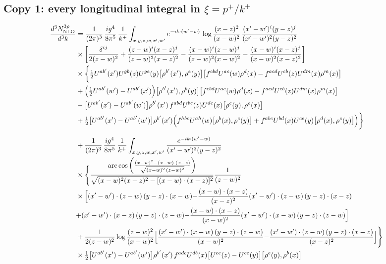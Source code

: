 \documentclass[10pt]{article}
\begin{document}
\subsection*{Copy 1: every longitudinal integral in $\xi=p^{+}/k^{+}$}
\begin{align}
\frac{d^{3}N^{3\rho}_{\rm NLO}}{d^{3}k}&=\frac{1}{(2\pi)^{3}}\,\frac{ig^{4}}{8\pi^{5}}\,\frac{1}{k^{+}}\int_{x,y,z,w,x',w'}e^{-ik\cdot(w'-w)}\,\log\frac{(x-z)^{2}}{(x-w)^{2}}\,\frac{(x'-w')^{i}(y-z)^{j}}{(x'-w')^{2}(y-z)^{2}}\notag\\
&\times\bigg[\frac{\delta^{ij}}{2(z-w)^{2}}+\frac{(z-w)^{i}(x-z)^{j}}{(z-w)^{2}(x-z)^{2}}-\frac{(x-w)^{i}(z-w)^{j}}{(z-w)^{2}(x-w)^{2}}-\frac{(x-w)^{i}(x-z)^{j}}{(x-w)^{2}(x-z)^{2}}\bigg]\notag\\
&\times\bigg\{\tfrac12U^{ab'}(x')U^{gb}(z)U^{ge}(y)\big[\rho^{b'}(x'),\rho^{e}(y)\big]\big[f^{cbd}U^{ac}(w)\rho^{d}(x)-f^{acd}U^{cb}(z)U^{dm}(x)\rho^{m}(x)\big]\notag\\
&+\Big(\tfrac12U^{ab'}(w')-U^{ab'}(x')\Big)\big[\rho^{b'}(x'),\rho^{b}(y)\big]\big[f^{cbd}U^{ac}(w)\rho^{d}(x)-f^{acd}U^{cb}(z)U^{dm}(x)\rho^{m}(x)\big]\notag\\
&-\big[U^{ab'}(x')-U^{ab'}(w')\big]\rho^{b'}(x')\,f^{abd}U^{bc}(z)U^{de}(x)\big[\rho^{c}(y),\rho^{e}(x)\big]\notag\\
&+\tfrac12\big[U^{ab'}(x')-U^{ab'}(w')\big]\rho^{b'}(x')\Big(f^{hbc}U^{ah}(w)\big[\rho^{b}(x),\rho^{c}(y)\big]+f^{abc}U^{bd}(x)U^{ce}(y)\big[\rho^{d}(x),\rho^{e}(y)\big]\Big)\bigg\}\notag\\[6pt]
&+\frac{1}{(2\pi)^{3}}\,\frac{ig^{4}}{8\pi^{5}}\,\frac{1}{k^{+}}\int_{x,y,z,w,x',w'}\frac{e^{-ik\cdot(w'-w)}}{(x'-w')^{2}(y-z)^{2}}\notag\\
&\times\Bigg\{\frac{\mathrm{arc\,cos}\left(\frac{(x-w)^{2}-(x-w)\cdot (x-z)}{\sqrt{(x-w)^{2}\,(z-w)^{2}}}\right)}{\sqrt{(x-w)^{2}(x-z)^{2}-[(x-w)\cdot(x-z)]^{2}}}\frac{1}{(z-w)^{2}}\notag\\
&\times\Big[{(x'-w')\cdot(z-w)\,(y-z)\cdot(x-w)}{-\frac{(x-w)\cdot(x-z)}{(x-z)^{2}}(x'-w')\cdot(z-w)\,(y-z)\cdot(x-z)}\notag\\
&{+(x'-w')\cdot(x-z)\,(y-z)\cdot(z-w)}{-\frac{(x-w)\cdot(x-z)}{(x-w)^{2}}(x'-w')\cdot(x-w)\,(y-z)\cdot(z-w)}\Big]\notag\\
&+\frac{1}{2(z-w)^{2}}\log\frac{(z-w)^{2}}{(x-w)^{2}}\Big[{\frac{(x'-w')\cdot(x-w)\,(y-z)\cdot(z-w)}{(x-w)^{2}}}{-\frac{(x'-w')\cdot(z-w)\,(y-z)\cdot(x-z)}{(x-z)^{2}}}\Big]\Bigg\}\notag\\
&\times\tfrac12\big[U^{ab'}(x')-U^{ab'}(w')\big]\rho^{b'}(x')\,f^{adc}U^{db}(x)\big[U^{ce}(z)-U^{ce}(y)\big]\big[\rho^{e}(y),\rho^{b}(x)\big]\notag\\[6pt]

\end{align}
\end{document}
